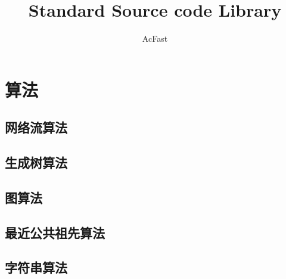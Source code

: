 \documentclass[12pt,a4paper,titlepage]{article}
\author{AcFast}
\title{Standard Source code Library}
\begin{document}

\maketitle
\tableofcontents

\newpage
\section{\LARGE 算法}

    \subsection{网络流算法}
    
    
    
    
    
    


    \subsection{生成树算法}
	


    \subsection{图算法}
    
    
	

    

    \subsection{最近公共祖先算法}
    
    

    \subsection{字符串算法}
	
    
    
    
    
	
\end{document}
